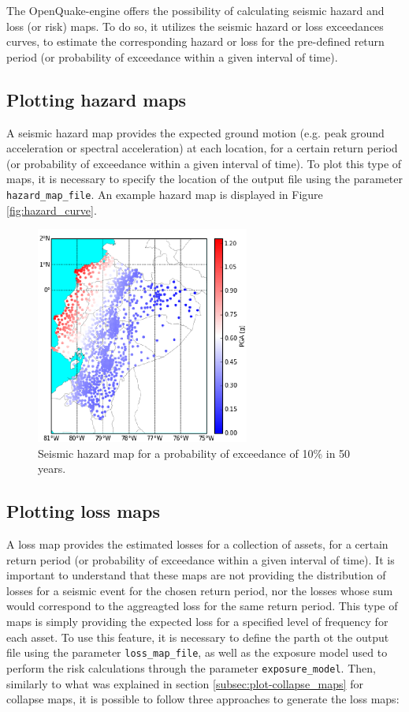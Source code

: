 The OpenQuake-engine offers the possibility of calculating seismic hazard and loss (or risk) maps. To do so, it utilizes the seismic hazard or loss exceedances curves, to estimate the corresponding hazard or loss for the pre-defined return period (or probability of exceedance within a given interval of time).

\subsection{Plotting hazard maps}
\label{subsec:plot-hazard_maps}
A seismic hazard map provides the expected ground motion (e.g. peak ground acceleration or spectral acceleration) at each location, for a certain return period (or probability of exceedance within a given interval of time). To plot this type of maps, it is necessary to specify the location of the output file using the parameter \verb=hazard_map_file=. An example hazard map is displayed in Figure \ref{fig:hazard_curve}.

\begin{figure}[htb]
  \centering
      \includegraphics[width=7cm]{figures/hazard_Ecuador.eps}
  \caption{Seismic hazard map for a probability of exceedance of 10\% in 50 years.}
  \label{fig:hazard_map}
\end{figure}

\subsection{Plotting loss maps}
\label{subsec:plot-loss_maps}
A loss map provides the estimated losses for a collection of assets, for a certain return period (or probability of exceedance within a given interval of time). It is important to understand that these maps are not providing the distribution of losses for a seismic event for the chosen return period, nor the losses whose sum would correspond to the aggreagted loss for the same return period. This type of maps is simply providing the expected loss for a specified level of frequency for each asset. 
To use this feature, it is necessary to define the parth ot the output file using the parameter \verb=loss_map_file=, as well as the exposure model used to perform the risk calculations through the parameter \verb=exposure_model=. Then, similarly to what was explained in section \ref{subsec:plot-collapse_maps} for collapse maps, it is possible to follow three approaches to generate the loss maps:\\ 

